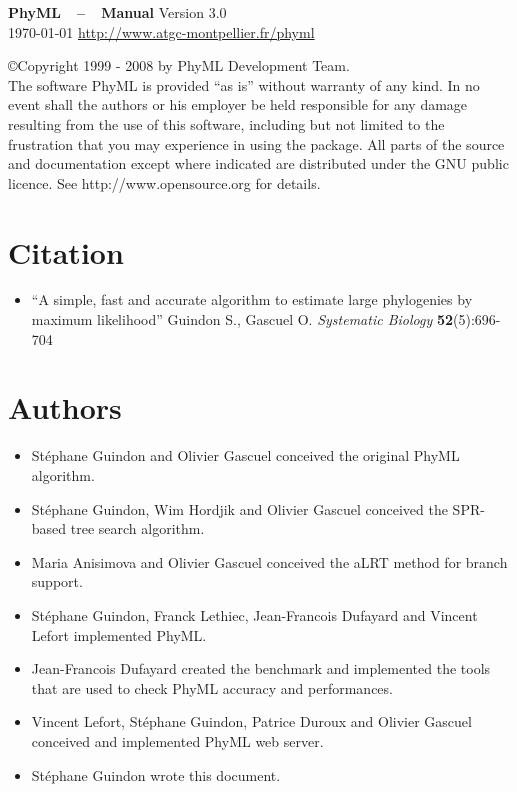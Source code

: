 \documentclass[a4paper,12pt]{article}
\begin{document}
\begin{center}
\thispagestyle{empty}
\vfill\vfill
{\Huge \textbf{ PhyML~~--~~Manual}}
\vfill
{\huge Version 3.0 \\
\today
\vfill
\href{http://www.atgc-montpellier.fr/phyml}{http://www.atgc-montpellier.fr/phyml}}
\end{center}
\clearpage
\tableofcontents
\clearpage

{\par
\small 
\noindent
\copyright Copyright 1999 - 2008 by PhyML Development Team.\\
\noindent The software PhyML is provided ``as is''  without warranty of any kind.  In no event shall
the authors  or his  employer be  held responsible  for any damage  resulting from  the use  of this
software, including but not limited to the frustration that you may experience in using the package.
All parts of the source and documentation except where indicated are distributed under
the GNU public licence. See http://www.opensource.org for details.

}

{
\noindent
\setlength{\baselineskip}{0.5\baselineskip}
\section{Citation}
\begin{itemize}
\item ``A simple, fast and accurate algorithm to estimate large phylogenies by maximum likelihood''
  Guindon S., Gascuel O. {\it Systematic Biology} {\bf \small 52}(5):696-704
\end{itemize}
}

{
\noindent
\setlength{\baselineskip}{0.7\baselineskip}
\section{Authors}
\begin{itemize}
\item { St\'ephane Guindon} and { Olivier Gascuel} conceived the original PhyML algorithm.
\item { St\'ephane Guindon, Wim Hordjik} and { Olivier Gascuel} conceived the SPR-based tree search algorithm.
\item { Maria Anisimova} and { Olivier Gascuel} conceived the aLRT method for branch support.
\item { St\'ephane Guindon, Franck Lethiec}, Jean-Francois Dufayard and Vincent Lefort implemented PhyML.
\item { Jean-Francois Dufayard} created the benchmark and implemented the tools that are used to check
  PhyML accuracy and performances. 
\item { Vincent Lefort, St\'ephane Guindon, Patrice Duroux} and { Olivier Gascuel} conceived and
  implemented PhyML web server.
\item St\'ephane Guindon wrote this document.
\end{itemize}
}
\clearpage
\end{document}
